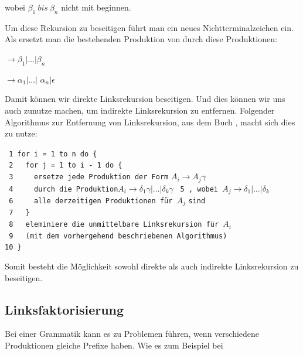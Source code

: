 \noindent wobei $\beta_1\ bis\ \beta_n$ nicht mit 
beginnen.\vspace{10pt}

\noindent Um diese Rekursion zu beseitigen führt man ein neues
Nichtterminalzeichen  ein. Als ersetzt man die
bestehenden Produktion von
 durch diese Produktionen:\vspace{10pt}

 $\to \beta_1 | \ldots | \beta_n$

 $\to \alpha_1$$|\ldots|$
$\alpha_n$$|\epsilon$\vspace{10pt}

\noindent Damit können wir direkte Linksrekursion beseitigen. Und dies können wir
uns auch zunutze machen, um indirekte Linksrekursion zu entfernen. Folgender
Algorithmus zur Entfernung von Linksrekursion, aus dem Buch \cite{Compilers},
macht sich dies zu nutze:\vspace{10pt}

\noindent
\verb| 1 for i = 1 to n do {|\\
\verb| 2   for j = 1 to i - 1 do {|\\
\verb| 3     ersetze jede Produktion der Form| $A_i \to A_j \gamma$ \verb| |\\ 
\verb| 4     durch die Produktion|$A_i \to \delta_1\gamma|\ldots|\delta_k\gamma$
\verb| 5 , wobei |$A_j \to \delta_1|\ldots|\delta_k$\\ 
\verb| 6     alle derzeitigen Produktionen für |$A_j$ \verb|sind|\\ 
\verb| 7   }|\\
\verb| 8   eleminiere die unmittelbare Linksrekursion für |$A_i$\\
\verb| 9   (mit dem vorhergehend beschriebenen Algorithmus)|\\
\verb|10 }|
\vspace{10pt}

Somit besteht die Möglichkeit sowohl direkte als auch indirekte Linksrekursion
zu beseitigen.\vspace{10pt}

\subsection{Linksfaktorisierung}

Bei einer Grammatik kann es zu Problemen führen, wenn verschiedene Produktionen
gleiche Prefixe haben. Wie es zum Beispiel bei \vspace{10pt}

